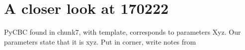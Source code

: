 \documentclass[%
 nofootinbib,
 amsmath,amssymb,
 aps,
 twocolumn,
 superscriptaddress
]{revtex4-2}
\newcommand{\mathcmd}[1]{{\sc \relax\ifmmode#1\else $#1$\fi}\xspace}
\newcommand{\msun}{\mathcmd{\text{M}_\odot}}
\begin{document}



\section{A closer look at 170222}\label{apdx:170222}
PyCBC found in chunk7, with template, corresponds to parameters Xyz. Our parameters state that it is xyz.
Put in corner, write notes from 






\end{document}
